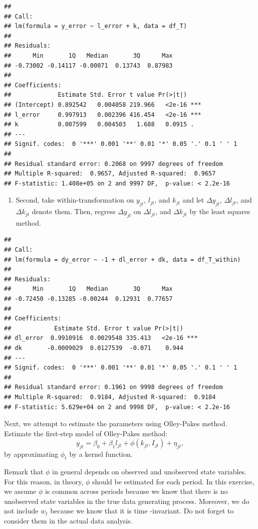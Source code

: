 \documentclass[]{book}
\providecommand{\tightlist}{%
  \setlength{\itemsep}{0pt}\setlength{\parskip}{0pt}}
\begin{document}
\begin{verbatim}
## 
## Call:
## lm(formula = y_error ~ l_error + k, data = df_T)
## 
## Residuals:
##      Min       1Q   Median       3Q      Max 
## -0.73002 -0.14117 -0.00071  0.13743  0.87983 
## 
## Coefficients:
##             Estimate Std. Error t value Pr(>|t|)    
## (Intercept) 0.892542   0.004058 219.966   <2e-16 ***
## l_error     0.997913   0.002396 416.454   <2e-16 ***
## k           0.007599   0.004503   1.688   0.0915 .  
## ---
## Signif. codes:  0 '***' 0.001 '**' 0.01 '*' 0.05 '.' 0.1 ' ' 1
## 
## Residual standard error: 0.2068 on 9997 degrees of freedom
## Multiple R-squared:  0.9657, Adjusted R-squared:  0.9657 
## F-statistic: 1.408e+05 on 2 and 9997 DF,  p-value: < 2.2e-16
\end{verbatim}

\begin{enumerate}
\def\labelenumi{\arabic{enumi}.}
\setcounter{enumi}{1}
\tightlist
\item
  Second, take within-transformation on \(y_{jt}\), \(l_{jt}\), and
  \(k_{jt}\) and let \(\Delta y_{jt}\), \(\Delta l_{jt}\), and
  \(\Delta k_{jt}\) denote them. Then, regress \(\Delta y_{jt}\) on
  \(\Delta l_{jt}\), and \(\Delta k_{jt}\) by the least squares method.
\end{enumerate}

\begin{verbatim}
## 
## Call:
## lm(formula = dy_error ~ -1 + dl_error + dk, data = df_T_within)
## 
## Residuals:
##      Min       1Q   Median       3Q      Max 
## -0.72450 -0.13285 -0.00244  0.12931  0.77657 
## 
## Coefficients:
##            Estimate Std. Error t value Pr(>|t|)    
## dl_error  0.9910916  0.0029548 335.413   <2e-16 ***
## dk       -0.0009029  0.0127539  -0.071    0.944    
## ---
## Signif. codes:  0 '***' 0.001 '**' 0.01 '*' 0.05 '.' 0.1 ' ' 1
## 
## Residual standard error: 0.1961 on 9998 degrees of freedom
## Multiple R-squared:  0.9184, Adjusted R-squared:  0.9184 
## F-statistic: 5.629e+04 on 2 and 9998 DF,  p-value: < 2.2e-16
\end{verbatim}

Next, we attempt to estimate the parameters using Olley-Pakes method.
Estimate the first-step model of Olley-Pakes method: \[
y_{jt} = \beta_0 + \beta_1 l_{jt} + \phi(k_{jt}, I_{jt}) + \eta_{jt},
\] by approximating \(\phi_t\) by a kernel function.

Remark that \(\phi\) in general depends on observed and unobserved state
variables. For this reason, in theory, \(\phi\) should be estimated for
each period. In this exercise, we assume \(\phi\) is common across
periods because we know that there is no unobserved state variables in
the true data generating process. Moreover, we do not include \(w_t\)
because we know that it is time -invariant. Do not forget to consider
them in the actual data analysis.
\end{document}

